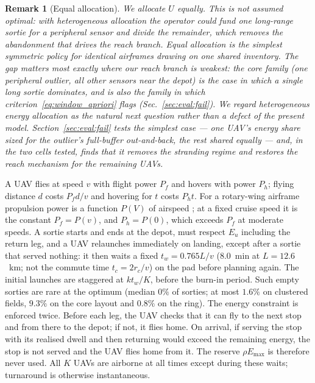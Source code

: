 \documentclass[journal,outdir=./]{IEEEtran}
\newtheorem{remark}{Remark}
\newcommand{\rc}{r_{c}}
\newcommand{\Pf}{P_{f}}
\newcommand{\Ph}{P_{h}}
\newcommand{\Emax}{E_{\max}}
\newcommand{\Eu}{E_{u}}
\begin{document}
\begin{remark}[Equal allocation]\label{rem:equal}
We allocate $U$ equally. This is not assumed optimal: with heterogeneous allocation the operator could fund one long-range sortie for a peripheral sensor and divide the remainder, which removes the abandonment that drives the reach branch. Equal allocation is the simplest symmetric policy for identical airframes drawing on one shared inventory. The gap matters most exactly where our reach branch is weakest: the \emph{core} family (one peripheral outlier, all other sensors near the depot) is the case in which a single long sortie dominates, and is also the family in which criterion~\eqref{eq:window_apriori} flags (Sec.~\ref{sec:eval:fail}). We regard heterogeneous energy allocation as the natural next question rather than a defect of the present model. Section~\ref{sec:eval:fail} tests the simplest case --- one UAV's energy share sized for the outlier's full-buffer out-and-back, the rest shared equally --- and, in the two cells tested, finds that it removes the stranding regime and restores the reach mechanism for the remaining UAVs.
\end{remark} A UAV flies at speed $v$ with flight power $\Pf$ and hovers with power $\Ph$; flying distance $d$ costs $\Pf d/v$ and hovering for $t$ costs $\Ph t$. For a rotary-wing airframe propulsion power is a function $P(V)$ of airspeed \cite{zeng2019energy}; at a fixed cruise speed it is the constant $\Pf=P(v)$, and $\Ph=P(0)$, which exceeds $\Pf$ at moderate speeds. A sortie starts and ends at the depot, must respect $\Eu$ including the return leg, and a UAV relaunches immediately on landing, except after a sortie that served nothing: it then waits a fixed $t_w=0.765L/v$ ($8.0$~min at $L=12.6$~km; not the commute time $t_c=2\rc/v$) on the pad before planning again. The initial launches are staggered at $kt_w/K$, before the burn-in period. Such empty sorties are rare at the optimum (median $0\%$ of sorties; at most $1.6\%$ on clustered fields, $9.3\%$ on the core layout and $0.8\%$ on the ring). The energy constraint is enforced twice. Before each leg, the UAV checks that it can fly to the next stop and from there to the depot; if not, it flies home. On arrival, if serving the stop with its realised dwell and then returning would exceed the remaining energy, the stop is not served and the UAV flies home from it. The reserve $\rho\Emax$ is therefore never used. All $K$ UAVs are airborne at all times except during these waits; turnaround is otherwise instantaneous.
\end{document}
